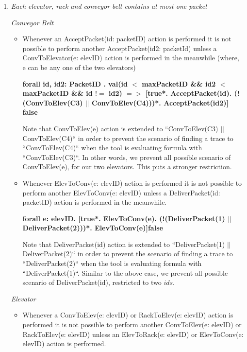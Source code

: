 \begin{enumerate}
\item \textit{Each elevator, rack and conveyor belt contains at most one packet}

	\textit{Conveyor Belt}
	\begin{itemize}
	\item
	Whenever an AcceptPacket(id: packetID) action is performed it is not possible to perform another AcceptPacket(id2: packetId) unless a ConvToElevator(e: elevID) action is performed in the meanwhile (where, e can be any one of the two elevators)
	
	\textbf{
	forall id, id2: PacketID . val(id $<$ maxPacketID \&\& id2 $<$ maxPacketID \&\& id $!=$ id2) $=>$ [true*. AcceptPacket(id). (!(ConvToElev(C3) $||$ ConvToElev(C4)))*. AcceptPacket(id2)] false}
	
Note that ConvToElev(e) action is extended to ``ConvToElev(C3) $||$ ConvToElev(C4)`` in order to prevent the scenario of finding a trace to ``ConvToElev(C4)`` when the tool is evaluating formula with ``ConvToElev(C3)``. In other words, we prevent all possible scenario of ConvToElev(e), for our two elevators. This puts a stronger restriction.
	
	\item Whenever ElevToConv(e: elevID) action is performed it is
	not possible to perform another ElevToConv(e: 
	elevID) unless a DeliverPacket(id: packetID) action is performed in the meanwhile.
	
	\textbf{forall e: elevID. [true*. ElevToConv(e). (!(DeliverPacket(1) $||$ DeliverPacket(2)))*. ElevToConv(e)]false}

	
Note that DeliverPacket(id) action is extended to ``DeliverPacket(1) $||$ DeliverPacket(2)`` in order to prevent the scenario of finding a trace to ``DeliverPacket(2)`` when the tool is evaluating formula with ``DeliverPacket(1)``. Similar to the above case, we prevent all possible scenario of DeliverPacket(id), restricted to two $ids$.

\end{itemize}
	
	\textit{Elevator}
	\begin{itemize}
	\item Whenever a ConvToElev(e: elevID) or RackToElev(e: elevID) 
	action is performed it is not possible to perform another
	ConvToElev(e: elevID) or RackToElev(e: elevID) unless an 
	ElevToRack(e: elevID) or ElevToConv(e: elevID) action is performed.
	

\end{itemize}
\end{enumerate}
